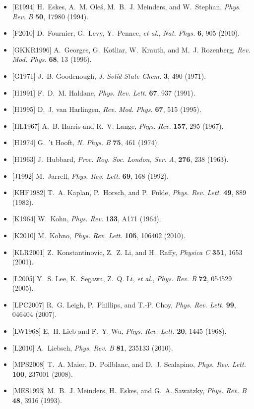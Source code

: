 \begin{itemize}[leftmargin=2em,itemsep=0pt,parsep=0pt,label={}]
\item {[E1994]} H.~Eskes, A.~M. Ole\'{s}, M.~B.~J. Meinders, and W.~Stephan, \emph{Phys. Rev. B} \textbf{50}, 17980 (1994).
\item {[F2010]} D.~Fournier, G.~Levy, Y.~Pennec, \emph{et al.}, \emph{Nat. Phys.} \textbf{6}, 905 (2010).
\item {[GKKR1996]} A.~Georges, G.~Kotliar, W.~Krauth, and M.~J. Rozenberg, \emph{Rev. Mod. Phys.} \textbf{68}, 13 (1996).
\item {[G1971]} J.~B. Goodenough, \emph{J. Solid State Chem.} \textbf{3}, 490 (1971).
\item {[H1991]} F.~D.~M. Haldane, \emph{Phys. Rev. Lett.} \textbf{67}, 937 (1991).
\item {[H1995]} D.~J. van Harlingen, \emph{Rev. Mod. Phys.} \textbf{67}, 515 (1995).
\item {[HL1967]} A.~B. Harris and R.~V. Lange, \emph{Phys. Rev.} \textbf{157}, 295 (1967).
\item {[H1974]} G.~'t Hooft, \emph{N. Phys. B} \textbf{75}, 461 (1974).
\item {[H1963]} J.~Hubbard, \emph{Proc. Roy. Soc. London, Ser. A}, \textbf{276}, 238 (1963).
\item {[J1992]} M.~Jarrell, \emph{Phys. Rev. Lett.} \textbf{69}, 168 (1992).
\item {[KHF1982]} T.~A. Kaplan, P.~Horsch, and P.~Fulde, \emph{Phys. Rev. Lett.} \textbf{49}, 889 (1982).
\item {[K1964]} W.~Kohn, \emph{Phys. Rev.} \textbf{133}, A171 (1964).
\item {[K2010]} M.~Kohno, \emph{Phys. Rev. Lett.} \textbf{105}, 106402 (2010).
\item {[KLR2001]} Z.~Konstantinovic, Z.~Z. Li, and H.~Raffy, \emph{Physica C} \textbf{351}, 1653 (2001).
\item {[L2005]} Y.~S. Lee, K.~Segawa, Z.~Q. Li, \emph{et al.}, \emph{Phys. Rev. B} \textbf{72}, 054529 (2005).
\item {[LPC2007]} R.~G. Leigh, P.~Phillips, and T.-P. Choy, \emph{Phys. Rev. Lett.} \textbf{99}, 046404 (2007).
\item {[LW1968]} E.~H. Lieb and F.~Y. Wu, \emph{Phys. Rev. Lett.} \textbf{20}, 1445 (1968).
\item {[L2010]} A.~Liebsch, \emph{Phys. Rev. B} \textbf{81}, 235133 (2010).
\item {[MPS2008]} T.~A. Maier, D.~Poilblanc, and D.~J. Scalapino, \emph{Phys. Rev. Lett.} \textbf{100}, 237001 (2008).
\item {[MES1993]} M.~B.~J. Meinders, H.~Eskes, and G.~A. Sawatzky, \emph{Phys. Rev. B} \textbf{48}, 3916 (1993).

\end{itemize}
